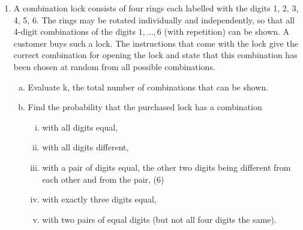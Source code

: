 \documentclass[a4paper,12pt]{article}
\begin{document}
\begin{enumerate}
\item A combination lock consists of four rings each labelled with the digits 1, 2, 3, 4, 5, 6. The rings may be rotated individually and independently, so that all 4-digit combinations of the digits $1, \ldots, 6$ (with repetition) can be shown. A customer buys such a lock. The instructions that come with the lock give the correct combination for opening the lock and state that this combination has been chosen at random from all possible combinations.
\begin{enumerate}[(a)]
\item Evaluate k, the total number of combinations that can be shown. 
\item Find the probability that the purchased lock has a combination
\begin{enumerate}[(i)]
\item with all digits equal, 
\item with all digits different, 
\item with a pair of digits equal, the other two digits being different from each other and from the pair, (6)
\item with exactly three digits equal, 
\item with two pairs of equal digits (but not all four digits the same).
\end{enumerate}
\end{enumerate}
\end{enumerate}
\end{document}
